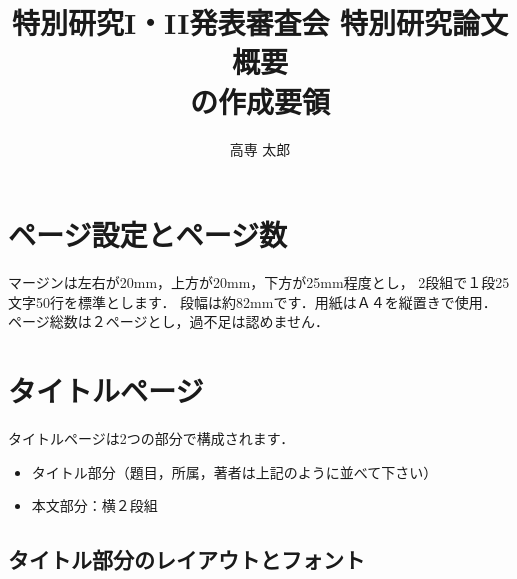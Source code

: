 \documentclass[a4j,10pt]{jsarticle}
\title{特別研究I・II発表審査会 特別研究論文概要\\の作成要領}
\author{高専 太郎}
\affiliation{創造工学専攻}
\begin{document}
\maketitle%

\setcounter{page}{1} %
\pagestyle{hyphenpage}
\thispagestyle{hyphenpage}



\section{ページ設定とページ数}

マージンは左右が20mm，上方が20mm，下方が25mm程度とし，
2段組で１段25文字50行を標準とします．
段幅は約82mmです．用紙はＡ４を縦置きで使用．
ページ総数は２ページとし，過不足は認めません．

\section{タイトルページ}

タイトルページは2つの部分で構成されます．
\begin{itemize}
\item タイトル部分（題目，所属，著者は上記のように並べて下さい）
\item 本文部分：横２段組
\end{itemize}

\subsection{タイトル部分のレイアウトとフォント}
\end{document}
